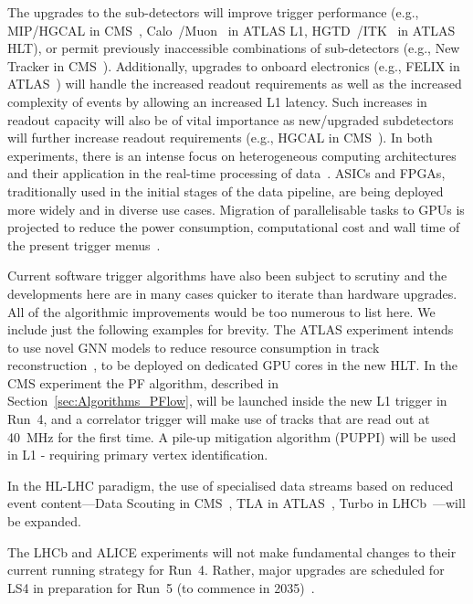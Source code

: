 The upgrades to the sub-detectors will improve trigger performance (e.g., MIP/HGCAL in CMS~\cite{cms2019mip, cms2017phase-hgcal}, Calo~\cite{ATLAS:ECAL, ATLAS:HCAL}/Muon~\cite{ATLAS:Muon} in ATLAS L1, HGTD~\cite{ATLAS:HGTD}/ITK~\cite{ATLAS:ITKPixel, ATLAS:ITKStrip} in ATLAS HLT), or permit previously inaccessible combinations of sub-detectors (e.g., New Tracker in CMS~\cite{collaboration2017phasecms}). Additionally, upgrades to onboard electronics (e.g., FELIX in ATLAS~\cite{ATLAS:FELIX, ATLAS:TDAQ}) will handle the increased readout requirements as well as the increased complexity of events by allowing an increased L1 latency. Such increases in readout capacity will also be of vital importance as new/upgraded subdetectors will further increase readout requirements (e.g., HGCAL in CMS~\cite{cms2017phase-hgcal}).
In both experiments, there is an intense focus on heterogeneous computing architectures and their application in the real-time processing of data~\cite{ATLAS:c-and-s-roadmap,bocci2020heterogeneouscms}. ASICs and FPGAs, traditionally used in the initial stages of the data pipeline, are being deployed more widely and in diverse use cases. Migration of parallelisable tasks to GPUs is projected to reduce the power consumption, computational cost and wall time of the present trigger menus~\cite{cms-GPU-clustering}. 

Current software trigger algorithms have also been subject to scrutiny and the developments here are in many cases quicker to iterate than hardware upgrades. All of the algorithmic improvements would be too numerous to list here. We include just the following examples for brevity.
The ATLAS experiment intends to use novel GNN models to reduce resource consumption in track reconstruction~\cite{Caillou:2815578}, to be deployed on dedicated GPU cores in the new HLT.
In the CMS experiment the PF algorithm, described in Section~\ref{sec:Algorithms_PFlow}, will be launched inside the new L1 trigger in Run~4, and a correlator trigger will make use of tracks that are read out at \SI{40}{MHz} for the first time. A pile-up mitigation algorithm (PUPPI) will be used in L1 - requiring primary vertex identification.

In the HL-LHC paradigm, the use of specialised data streams based on reduced event content—Data Scouting in CMS~\cite{ardino202340cms,tomei2020cms,badaro202040cms}, TLA in ATLAS~\cite{ATLAS:TLA}, Turbo in LHCb~\cite{Aaij:2019uij}—will be expanded.



The LHCb and ALICE experiments will not make fundamental changes to their current running strategy for Run~4. Rather, major upgrades are scheduled for LS4 in preparation for Run~5 (to commence in 2035)~\cite{CERN-LHCC-2021-012, alice_loi_hl_lhc}.

